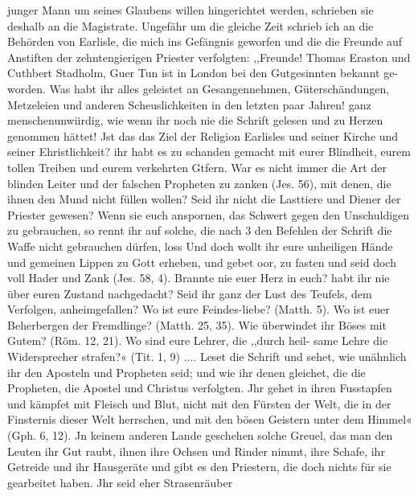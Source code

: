 junger Mann um seines Glaubens willen hingerichtet werden,
schrieben sie deshalb an die Magistrate.
Ungefähr um die gleiche Zeit schrieb ich an die Behörden
von Earlisle, die mich ins Gefängnis geworfen und die die
Freunde auf Anstiften der zehntengierigen Priester verfolgten:
,,Freunde! Thomas Eraston und Cuthbert Stadholm,
Guer Tun ist in London bei den Gutgesinnten bekannt ge-
worden. Was habt ihr alles geleistet an Gesangennehmen,
Güterschändungen, Metzeleien und anderen Scheuslichkeiten in den
letzten paar Jahren! ganz menschenunwiirdig, wie wenn ihr
noch nie die Schrift gelesen und zu Herzen genommen hättet!
Jst das das Ziel der Religion Earlisles und seiner Kirche und
seiner Ehristlichkeit? ihr habt es zu schanden gemacht mit eurer
Blindheit, eurem tollen Treiben und eurem verkehrten Gtfern.
War es nicht immer die Art der blinden Leiter und der falschen
Propheten zu zanken (Jes. 56), mit denen, die ihnen den Mund
nicht füllen wollen? Seid ihr nicht die Lasttiere und Diener der
Priester gewesen? Wenn sie euch anspornen, das Schwert gegen
den Unschuldigen zu gebrauchen, so rennt ihr auf solche, die nach 3
den Befehlen der Schrift die Waffe nicht gebrauchen dürfen, loss
Und doch wollt ihr eure unheiligen Hände und gemeinen Lippen
zu Gott erheben, und gebet oor, zu fasten und seid doch voll
Hader und Zank (Jes. 58, 4). Brannte nie euer Herz in euch?
habt ihr nie über euren Zustand nachgedacht? Seid ihr ganz
der Lust des Teufels, dem Verfolgen, anheimgefallen? Wo ist
eure Feindes-liebe? (Matth. 5). Wo ist euer Beherbergen der
Fremdlinge? (Matth. 25, 35). Wie überwindet ihr Böses mit
Gutem? (Röm. 12, 21). Wo sind eure Lehrer, die ,,durch heil-
same Lehre die Widersprecher strafen?« (Tit. 1, 9) .... Leset die
Schrift und sehet, wie unähnlich ihr den Aposteln und Propheten
seid; und wie ihr denen gleichet, die die Propheten, die Apostel
und Christus verfolgten. Jhr gehet in ihren Fusstapfen und
kämpfet mit Fleisch und Blut, nicht mit den Fürsten der Welt,
die in der Finsternis dieser Welt herrschen, und mit den bösen
Geistern unter dem Himmel« (Gph. 6, 12). Jn keinem anderen
Lande geschehen solche Greuel, das man den Leuten ihr Gut
raubt, ihnen ihre Ochsen und Rinder nimmt, ihre Schafe, ihr
Getreide und ihr Hausgeräte und gibt es den Priestern, die doch
nichts für sie gearbeitet haben. Jhr seid eher Strasenräuber


